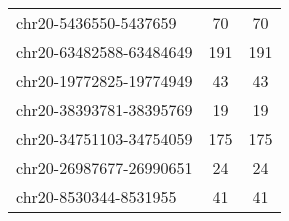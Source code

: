 \begin{longtable}{lSS}
	chr20-5436550-5437659   & 70     & 70                         \\
	chr20-63482588-63484649 & 191    & 191                        \\
	chr20-19772825-19774949 & 43     & 43                         \\
	chr20-38393781-38395769 & 19     & 19                         \\
	chr20-34751103-34754059 & 175    & 175                        \\
	chr20-26987677-26990651 & 24     & 24                         \\
	chr20-8530344-8531955   & 41     & 41                         \\
\end{longtable}
